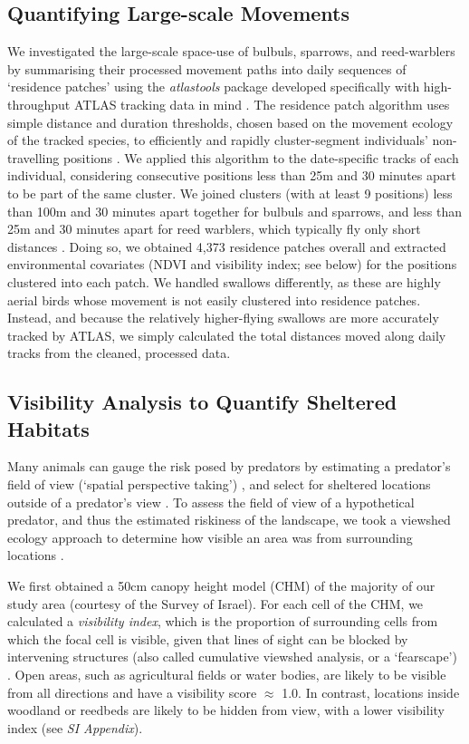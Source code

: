 \subsection*{Quantifying Large-scale Movements}

We investigated the large-scale space-use of bulbuls, sparrows, and reed-warblers by summarising their processed movement paths into daily sequences of `residence patches' using the \textit{atlastools} package developed specifically with high-throughput ATLAS tracking data in mind \citep{gupte2022d}.
The residence patch algorithm uses simple distance and duration thresholds, chosen based on the movement ecology of the tracked species, to efficiently and rapidly cluster-segment individuals' non-travelling positions \citep{gupte2022d}.
We applied this algorithm to the date-specific tracks of each individual, considering consecutive positions less than 25m and 30 minutes apart to be part of the same cluster.
We joined clusters (with at least 9 positions) less than 100m and 30 minutes apart together for bulbuls and sparrows, and less than 25m and 30 minutes apart for reed warblers, which typically fly only short distances \cite{kiat2016}.
Doing so, we obtained 4,373 residence patches overall and extracted environmental covariates (NDVI and visibility index; see below) for the positions clustered into each patch.
We handled swallows differently, as these are highly aerial birds whose movement is not easily clustered into residence patches.
Instead, and because the relatively higher-flying swallows are more accurately tracked by ATLAS, we simply calculated the total distances moved along daily tracks from the cleaned, processed data.

\subsection*{Visibility Analysis to Quantify Sheltered Habitats}

Many animals can gauge the risk posed by predators by estimating a predator's field of view (`spatial perspective taking') \cite{emery2000,bruce2003,davidson2016}, and select for sheltered locations outside of a predator's view \citep{hampton1994,krams2001,watve2002}.
To assess the field of view of a hypothetical predator, and thus the estimated riskiness of the landscape, we took a viewshed ecology approach to determine how visible an area was from surrounding locations \citep{aben2018,aben2021}.

We first obtained a 50cm canopy height model (CHM) \citep{aben2021} of the majority of our study area (courtesy of the Survey of Israel).
For each cell of the CHM, we calculated a \textit{visibility index}, which is the proportion of surrounding cells from which the focal cell is visible, given that lines of sight can be blocked by intervening structures (also called cumulative viewshed analysis, or a `fearscape') \cite{olsoy2015}.
Open areas, such as agricultural fields or water bodies, are likely to be visible from all directions and have a visibility score $\approx$ 1.0.
In contrast, locations inside woodland or reedbeds are likely to be hidden from view, with a lower visibility index (see \textit{SI Appendix}).

